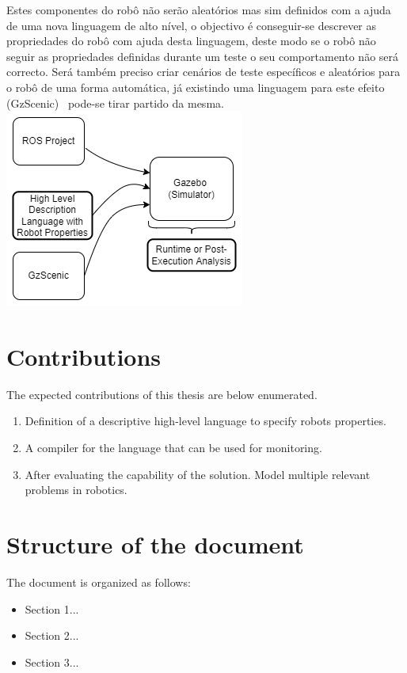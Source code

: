 Estes componentes do robô não serão aleatórios mas sim definidos com a ajuda de uma nova linguagem de 
alto nível, o objectivo é conseguir-se descrever as propriedades do robô com ajuda desta linguagem, 
deste modo se o robô não seguir as propriedades definidas durante um teste o seu comportamento não será 
correcto. Será também preciso criar cenários de teste específicos e aleatórios para o robô de uma forma 
automática, já existindo uma linguagem para este efeito (GzScenic)~\cite{GzScenic} pode-se tirar partido 
da mesma.
\includegraphics{images/intro_diag.png}

\section{Contributions}
\label{sec:contributions}

The expected contributions of this thesis are below enumerated.

\begin{enumerate}
    \item Definition of a descriptive high-level language to specify robots properties.
    \item A compiler for the language that can be used for monitoring.
    \item After evaluating the capability of the solution. Model multiple relevant problems in robotics.
\end{enumerate}

\section{Structure of the document}
\label{sec:structure}

The document is organized as follows:

\begin{itemize}
    \item Section 1...
    \item Section 2...
    \item Section 3...
\end{itemize}

